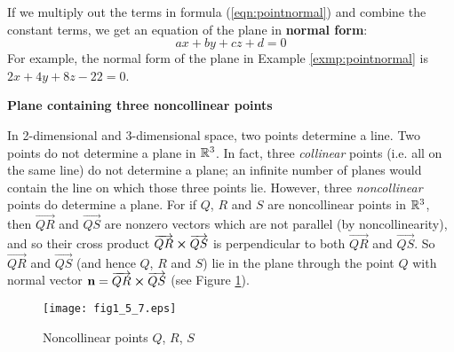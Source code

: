 If we multiply out the terms in formula (\ref{eqn:pointnormal}) and combine the constant terms, we get an
equation of the plane in \textbf{normal form}:
\begin{equation}
 ax + by + cz + d = 0
\end{equation}
For example, the normal form of the plane in Example \ref{exmp:pointnormal} is $2x + 4y + 8z - 22 = 0$.
\newpage
\par\noindent\textbf{\large{Plane containing three noncollinear points}}\normalsize\vspace{1.5mm}

In 2-dimensional and 3-dimensional space, two points determine a line. Two points do not determine a plane in
$\mathbb{R}^{3}$. In fact, three \emph{collinear} points (i.e. all on the same line)
do not determine a plane; an infinite number of planes would contain the line on which those three points lie.
However, three \emph{noncollinear} points do determine a plane. For if $Q$, $R$ and $S$ are noncollinear points in
$\mathbb{R}^{3}$, then $\overrightarrow{QR}$ and $\overrightarrow{QS}$ are  nonzero vectors which are not parallel (by
noncollinearity), and so their cross product $\overrightarrow{QR} \bm{\times} \overrightarrow{QS}$ is perpendicular to
both $\overrightarrow{QR}$ and $\overrightarrow{QS}$. So $\overrightarrow{QR}$ and
$\overrightarrow{QS}$ (and hence $Q$, $R$ and $S$) lie in the plane through the point $Q$ with normal vector
$\textbf{n} = \overrightarrow{QR} \bm{\times} \overrightarrow{QS}$ (see Figure \ref{fig:plane3pts}).

\begin{figure}[h]
 \begin{center}
  \texttt{[image: fig1\_5\_7.eps]}
 \end{center}\vspace{-5mm}
 \caption[]{\quad Noncollinear points $Q$, $R$, $S$}
 \label{fig:plane3pts}
\end{figure}

